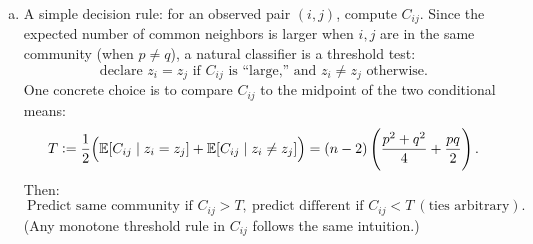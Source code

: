 \documentclass{article}
\begin{document}
\begin{tcolorbox}[colback=white, colframe=black!70, title=\textbf{Solution to Exercise 1}, breakable]
\begin{enumerate}[(a)]
\item A simple decision rule: for an observed pair $(i,j)$, compute $C_{ij}$. Since the expected number of common neighbors is larger when $i,j$ are in the same community (when $p\neq q$), a natural classifier is a threshold test:
\[
\text{declare } z_i=z_j \text{ if } C_{ij} \text{ is ``large,'' and } z_i\neq z_j \text{ otherwise.}
\]
One concrete choice is to compare $C_{ij}$ to the midpoint of the two conditional means:
\[
T := \frac12\Big(\mathbb{E}[C_{ij}\mid z_i=z_j]+\mathbb{E}[C_{ij}\mid z_i\neq z_j]\Big)
=(n-2)\left(\frac{p^2+q^2}{4}+\frac{pq}{2}\right).
\]
Then:
\[
\boxed{\ \text{Predict same community if } C_{ij}>T,\ \text{predict different if } C_{ij}<T\ (\text{ties arbitrary}).\ }
\]
(Any monotone threshold rule in $C_{ij}$ follows the same intuition.)
\end{enumerate}
\end{tcolorbox}

\vspace{12pt}
\end{document}
